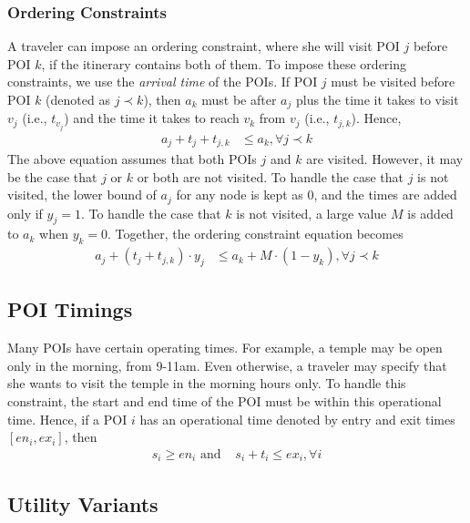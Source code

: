 \subsubsection{\textbf{Ordering Constraints}}
\label{sec:ordering}

A traveler can impose an ordering constraint, where she will visit POI $j$ before POI $k$, if the itinerary contains both of them.
To impose these ordering constraints, we use the \emph{arrival time} of the POIs.
If POI $j$ must be visited before POI $k$ (denoted as $j \prec k$), then $a_k$ must be after $a_j$ plus
the time it takes to visit $v_j$ (i.e., $t_{v_j}$) and the time it takes to
reach $v_k$ from $v_j$ (i.e., $t_{j,k}$).
Hence,
%
\begin{align}
	a_j + t_{j} + t_{j,k} & \leq a_k, \forall j \prec k
\end{align}
%
The above equation assumes that both POIs $j$ and $k$ are visited.
However, it may be the case that $j$ or $k$ or both are not visited.
To handle the case that $j$ is not visited, the lower bound of $a_j$ for any
node is kept as $0$, and the times are added only if $y_j = 1$.
To handle the case that $k$ is not visited, a large value $M$ is added to $a_k$
when $y_k = 0$.
Together, the ordering constraint equation becomes
%
\begin{align}
	\label{eq:ordering}
	a_j + (t_{j} + t_{j,k}) \cdot y_j & \leq a_k + M \cdot (1 - y_k), \forall j \prec k
\end{align}

\subsection{POI Timings}
\label{sec:timings}

Many POIs have certain operating times.  For example, a temple may be open
only in the morning, from 9-11am.  Even otherwise, a traveler may specify that she wants to visit the temple in the morning hours only.  To handle this constraint, the start and
end time of the POI must be within this operational time.  Hence, if a POI
$i$ has an operational time denoted by entry and exit times $[en_i, ex_i]$,
then
%
\begin{align}
	\label{eq:operational}
	s_i \geq en_i \text{ and } & s_i + t_{i} \leq ex_i, \forall i
\end{align}

\subsection{Utility Variants}
\label{sec:utility}

